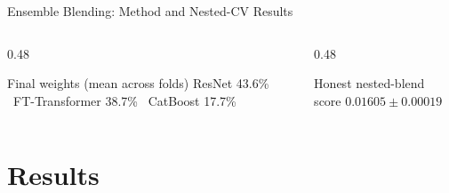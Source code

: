 \documentclass[9pt,aspectratio=169]{beamer}
\begin{document}
\begin{frame}{Ensemble Blending: Method and Nested-CV Results}
\begin{columns}[T]
    \begin{column}{0.48\textwidth}
      \begin{block}{Final weights (mean across folds)}
        \small
        ResNet 43.6\% \textbar\ FT-Transformer 38.7\% \textbar\ CatBoost 17.7\%
      \end{block}
    \end{column}
    \begin{column}{0.48\textwidth}
      \begin{exampleblock}{Honest nested-blend score}
        \small $0.01605 \pm 0.00019$
      \end{exampleblock}
    \end{column}
  \end{columns}
\end{frame}

\section{Results}
\end{document}
